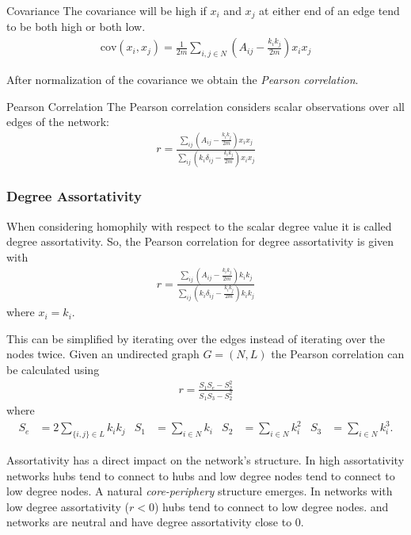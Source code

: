 \documentclass[english]{panikzettel}
\begin{document}
\begin{defi}{Covariance}
The covariance will be high if $ x_i $ and $ x_j $ at either end of an edge tend to be both high or both low.
\begin{align*}
	\text{cov} (x_i, x_j) = \frac{1}{2m} \sum\limits_{i,j \in N} \left(A_{ij} - \frac{k_i k_j}{2m}\right) x_i x_j
\end{align*}
\end{defi}

After normalization of the covariance we obtain the \textit{Pearson correlation}.

\begin{defi}{Pearson Correlation}
The Pearson correlation considers scalar observations over all edges of the network:
\begin{align*}
	r = \frac{\sum_{ij} (A_{ij} - \frac{k_i k_j}{2m}) x_i x_j}{\sum_{ij} (k_i \delta_{ij} - \frac{k_i k_j}{2m}) x_i x_j}
\end{align*}
\end{defi}

\subsubsection{Degree Assortativity}
When considering homophily with respect to the scalar degree value it is called degree assortativity.
So, the Pearson correlation for degree assortativity is given with
\begin{align*}
	r = \frac{\sum_{ij} (A_{ij} - \frac{k_i k_j}{2m}) k_i k_j}{\sum_{ij} (k_i \delta_{ij} - \frac{k_i k_j}{2m}) k_i k_j}
\end{align*}
where $ x_i = k_i $.

This can be simplified by iterating over the edges instead of iterating over the nodes twice. Given an undirected graph $ G = (N,L) $ the Pearson correlation can be calculated using
\begin{align*}
	r = \frac{S_1 S_e - S_2^2}{S_1 S_3 - S_2^2}
\end{align*}
where 
\begin{align*}
	S_e &= 2 \sum\limits_{\{i,j\} \in L} k_i k_j & S_1 &= \sum\limits_{i \in N} k_i & S_2 &= \sum\limits_{i \in N} k_i^2 & S_3 &= \sum\limits_{i \in N} k_i^3.
\end{align*}

Assortativity has a direct impact on the network's structure.
In high assortativity networks hubs tend to connect to hubs and low degree nodes tend to connect to low degree nodes.
A natural \textit{core-periphery} structure emerges.
In networks with low degree assortativity ($ r < 0 $) hubs tend to connect to low degree nodes.
\hyperref[sec:erdosrenyi_model]{\erdosrenyi} and \hyperref[sec:barabasi_albert_model]{\barabasi} networks are neutral and have degree assortativity close to 0.
\end{document}
